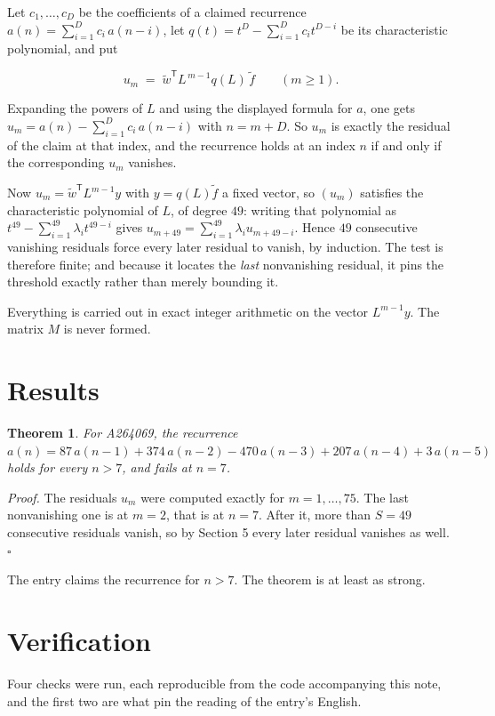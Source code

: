 \documentclass[11pt]{article}
\newtheorem{theorem}{Theorem}
\theoremstyle{definition}
\begin{document}
Let $c_1,\dots,c_D$ be the coefficients of a claimed recurrence $a(n) = \sum_{i=1}^{D} c_i\,a(n-i)$, let $q(t) = t^{D} - \sum_{i=1}^{D} c_i t^{D-i}$ be its characteristic polynomial, and put

\[u_m \;=\; \tilde w^{\mathsf T} L^{\,m-1} q(L)\,\tilde f \qquad (m \ge 1).\]

Expanding the powers of $L$ and using the displayed formula for $a$, one gets $u_m = a(n) - \sum_{i=1}^{D} c_i\,a(n-i)$ with $n = m + D$. So $u_m$ is exactly the residual of the claim at that index, and the recurrence holds at an index $n$ if and only if the corresponding $u_m$ vanishes.

Now $u_m = \tilde w^{\mathsf T} L^{m-1} y$ with $y = q(L)\tilde f$ a fixed vector, so $(u_m)$ satisfies the characteristic polynomial of $L$, of degree $49$: writing that polynomial as $t^{49} - \sum_{i=1}^{49} \lambda_i t^{49-i}$ gives $u_{m+49} = \sum_{i=1}^{49} \lambda_i u_{m+49-i}$. Hence $49$ consecutive vanishing residuals force every later residual to vanish, by induction. The test is therefore finite; and because it locates the {\itshape last} nonvanishing residual, it pins the threshold exactly rather than merely bounding it.

Everything is carried out in exact integer arithmetic on the vector $L^{m-1}y$. The matrix $M$ is never formed.

\section{Results}

\begin{theorem} For A264069, the recurrence $a(n) = 87\,a(n-1) + 374\,a(n-2) - 470\,a(n-3) + 207\,a(n-4) + 3\,a(n-5)$ holds for every $n > 7$, and fails at $n = 7$.\end{theorem}

{\itshape Proof.} The residuals $u_m$ were computed exactly for $m = 1,\dots,75$. The last nonvanishing one is at $m = 2$, that is at $n = 7$. After it, more than $S = 49$ consecutive residuals vanish, so by Section 5 every later residual vanishes as well. $\square$

The entry claims the recurrence for $n > 7$. The theorem is at least as strong.

\section{Verification}

Four checks were run, each reproducible from the code accompanying this note, and the first two are what pin the reading of the entry's English.
\end{document}
